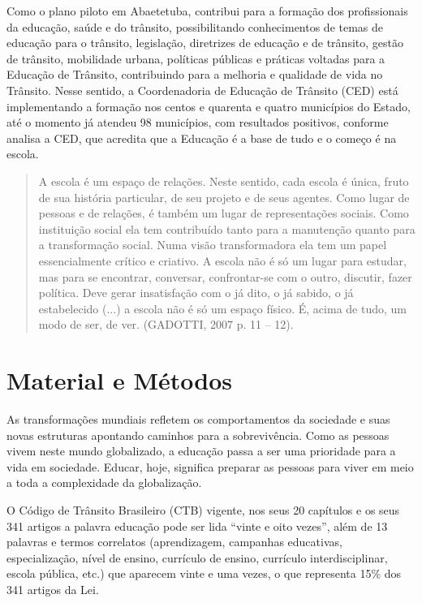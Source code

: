 \documentclass[output=paper,colorlinks,citecolor=brown]{langscibook}
\begin{document}
Como o plano piloto em Abaetetuba, contribui para a formação dos profissionais da educação, saúde e do trânsito, possibilitando conhecimentos de temas de educação para o trânsito, legislação, diretrizes de educação e de trânsito, gestão de trânsito, mobilidade urbana, políticas públicas e práticas voltadas para a Educação de Trânsito, contribuindo para a melhoria e qualidade de vida no Trânsito. Nesse sentido, a Coordenadoria de Educação de Trânsito (CED) está implementando a formação nos centos e quarenta e quatro municípios do Estado, até o momento já atendeu 98 municípios, com resultados positivos, conforme analisa a CED, que acredita que a Educação é a base de tudo e o começo é na escola.\vskip0.3cm

\begin{quote}
        A escola é um espaço de relações. Neste sentido, cada escola é única, fruto de sua história particular, de seu projeto e de seus agentes. Como lugar de pessoas e de relações, é também um lugar de representações sociais. Como instituição social ela tem contribuído tanto para a manutenção quanto para a transformação social. Numa visão transformadora ela tem um papel essencialmente crítico e criativo. A escola não é só um lugar para estudar, mas para se encontrar, conversar, confrontar-se com o outro, discutir, fazer política. Deve gerar insatisfação com o já dito, o já sabido, o já estabelecido (...) a escola não é só um espaço físico. É, acima de tudo, um modo de ser, de ver. (GADOTTI, 2007 p. 11 – 12).
\end{quote}



\newpage
\section{Material e Métodos}

As transformações mundiais refletem os comportamentos da sociedade e suas novas estruturas apontando caminhos para a sobrevivência. Como as pessoas vivem neste mundo globalizado, a educação passa a ser uma prioridade para a vida em sociedade. Educar, hoje, significa preparar as pessoas para viver em meio a toda a complexidade da globalização. \vskip0.3cm

O Código de Trânsito Brasileiro (CTB) vigente, nos seus 20 capítulos e os seus 341 artigos a palavra educação pode ser lida “vinte e oito vezes”, além de 13 palavras e termos correlatos (aprendizagem, campanhas educativas, especialização, nível de ensino, currículo de ensino, currículo interdisciplinar, escola pública, etc.) que aparecem vinte e uma vezes, o que representa 15\% dos 341 artigos da Lei. \vskip0.3cm
\end{document}
